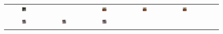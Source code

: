 \documentclass{article} %
\begin{document}
\begin{figure}[t]
\begin{minipage}{\textwidth}
{\begin{tabular}{ccccccc}
\includegraphics[width=0.17\textwidth]{figures/pot_1_conv} & &
\includegraphics[width=0.17\textwidth]{figures/pot_2_gt} &
\includegraphics[width=0.17\textwidth]{figures/pot_2_sift} &
\includegraphics[width=0.17\textwidth]{figures/pot_2_conv} \\
\includegraphics[width=0.17\textwidth]{figures/horse_1_gt} &
\includegraphics[width=0.17\textwidth]{figures/horse_1_sift} &
\includegraphics[width=0.17\textwidth]{figures/horse_1_conv} & &

\end{tabular}}
\end{minipage}
\end{figure}
\end{document}

